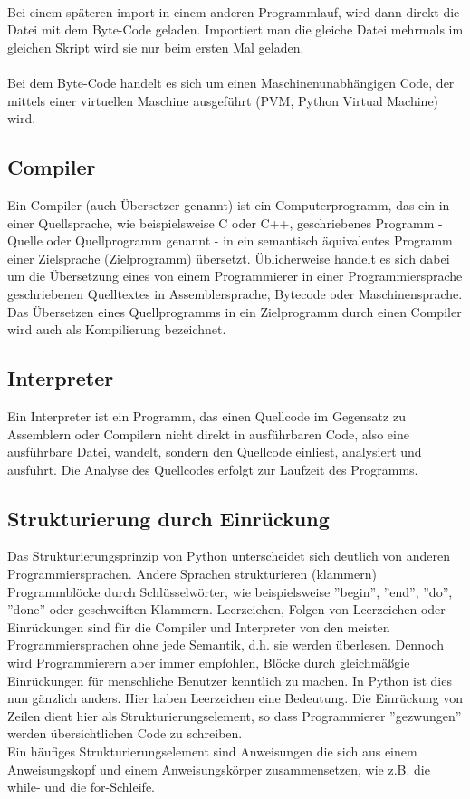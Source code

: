 \\
Bei einem späteren import in einem anderen Programmlauf, wird dann direkt die Datei mit dem Byte-Code geladen. Importiert man die gleiche Datei mehrmals im gleichen Skript wird sie nur beim ersten Mal geladen.\\
\\
Bei dem Byte-Code handelt es sich um einen Maschinenunabhängigen Code, der mittels einer virtuellen Maschine ausgeführt (PVM, Python Virtual Machine) wird. \\

\subsection{Compiler}
Ein Compiler (auch Übersetzer genannt) ist ein Computerprogramm, das ein in einer Quellsprache, wie beispielsweise C oder C++, geschriebenes Programm - Quelle oder Quellprogramm genannt - in ein semantisch äquivalentes Programm einer Zielsprache (Zielprogramm) übersetzt. Üblicherweise handelt es sich dabei um die Übersetzung eines von einem Programmierer in einer Programmiersprache geschriebenen Quelltextes in Assemblersprache, Bytecode oder Maschinensprache. Das Übersetzen eines Quellprogramms in ein Zielprogramm durch einen Compiler wird auch als Kompilierung bezeichnet. \\

\subsection{Interpreter}
Ein Interpreter ist ein Programm, das einen Quellcode im Gegensatz zu Assemblern oder Compilern nicht direkt in ausführbaren Code, also eine ausführbare Datei, wandelt, sondern den Quellcode einliest, analysiert und ausführt. Die Analyse des Quellcodes erfolgt zur Laufzeit des Programms. \\

\subsection{Strukturierung durch Einrückung}
Das Strukturierungsprinzip von Python unterscheidet sich deutlich von anderen Programmiersprachen. Andere Sprachen strukturieren (klammern) Programmblöcke durch Schlüsselwörter, wie beispielsweise ''begin'', ''end'', ''do'', ''done'' oder geschweiften Klammern. Leerzeichen, Folgen von Leerzeichen oder Einrückungen sind für die Compiler und Interpreter von den meisten Programmiersprachen ohne jede Semantik, d.h. sie werden überlesen. Dennoch wird Programmierern aber immer empfohlen, Blöcke durch gleichmäßgie Einrückungen für menschliche Benutzer kenntlich zu machen. In Python ist dies nun gänzlich anders. Hier haben Leerzeichen eine Bedeutung. Die Einrückung von Zeilen dient hier als Strukturierungselement, so dass Programmierer ''gezwungen'' werden übersichtlichen Code zu schreiben.\\
Ein häufiges Strukturierungselement sind Anweisungen die sich aus einem Anweisungskopf und einem Anweisungskörper zusammensetzen, wie z.B. die while- und die for-Schleife. \\

